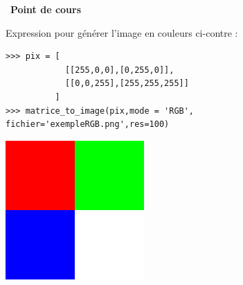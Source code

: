 \documentclass[a4paper, french, 12pt]{article}
\newcounter{cours}
\newenvironment{cours}[1]
{\par \medskip   \addtocounter{cours}{1} \noindent  
\begin{bclogo}[arrondi =0.1,  ombre = true, barre=none, logo=\bcbook, marge=4]{~\textbf{Point de cours} \textbf{\thecours} {\itshape #1} }  \par}
{
\end{bclogo}
 \par \bigskip }
\begin{document}
\begin{cours}{}
\begin{itemize}[label=]
\begin{minipage}{0.65\linewidth}
Expression pour générer l'image en couleurs ci-contre :

\begin{lstlisting}[style=compil]
>>> pix = [
			[[255,0,0],[0,255,0]],
			[[0,0,255],[255,255,255]]
		  ]
>>> matrice_to_image(pix,mode = 'RGB', 
fichier='exempleRGB.png',res=100)
\end{lstlisting}
\end{minipage}
\hfill
\begin{minipage}{0.3\linewidth}
\begin{center}
\includegraphics[scale=0.5]{images/exempleRGB.png}
\end{center}
\end{minipage}

\end{itemize}


\end{cours}





\vspace*{-15pt}
\end{document}
